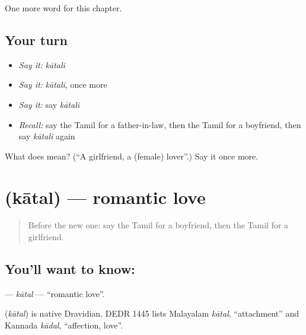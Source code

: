 \begin{grammarlens}[title={What you've built}]
One more word for this chapter.
\end{grammarlens}

\subsection*{Your turn}
\begin{itemize}
\raggedright
  \item \emph{Say it:} \emph{kātali}
  \item \emph{Say it:} \emph{kātali}, once more
  \item \emph{Say it:} say \emph{kātali}
  \item \emph{Recall:} say the Tamil for a father-in-law, then the Tamil for a boyfriend, then say \emph{kātali} again
\end{itemize}

\begin{tcolorbox}[breakable,colback=teal!4,colframe=teal!35!black,title={Before you move on}]
What does  mean? (\textquotedblleft{}A girlfriend, a (female) lover\textquotedblright{}.) Say it once more.
\end{tcolorbox}
\section[\texorpdfstring{\ta{காதல்} (kātal)}{காதல் (kātal)}]{ (kātal) — romantic love}

\label{lesson:TA-C186-katal}



\begin{quote}
Before the new one: say the Tamil for a boyfriend, then the Tamil for a girlfriend.
\end{quote}

\subsection*{You'll want to know: }
\textbf{} — \emph{kātal} — \textquotedblleft{}romantic love\textquotedblright{}.

\begin{cousinweb}
\textbf{} (\emph{kātal}) is native Dravidian. DEDR 1445 lists Malayalam \emph{kātal}, \textquotedblleft{}attachment\textquotedblright{} and Kannada \emph{kādal}, \textquotedblleft{}affection, love\textquotedblright{}.
\end{cousinweb}


